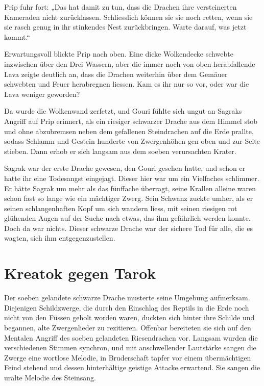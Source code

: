 Prip fuhr fort: „Das hat damit zu tun, dass die Drachen ihre versteinerten Kameraden nicht zurücklassen. Schliesslich können sie sie noch retten, wenn sie sie rasch genug in ihr stinkendes Nest zurückbringen. Warte darauf, was jetzt kommt.“

Erwartungsvoll blickte Prip nach oben. Eine dicke Wolkendecke schwebte inzwischen über den Drei Wassern, aber die immer noch von oben herabfallende Lava zeigte deutlich an, dass die Drachen weiterhin über dem Gemäuer schwebten und Feuer herabregnen liessen. Kam es ihr nur so vor, oder war die Lava weniger geworden?

Da wurde die Wolkenwand zerfetzt, und Gouri fühlte sich ungut an Sagraks Angriff auf Prip erinnert, als ein riesiger schwarzer Drache aus dem Himmel stob und ohne abzubremsen neben dem gefallenen Steindrachen auf die Erde prallte, sodass Schlamm und Gestein hunderte von Zwergenhöhen gen oben und zur Seite stieben. Dann erhob er sich langsam aus dem soeben verursachten Krater.

Sagrak war der erste Drache gewesen, den Gouri gesehen hatte, und schon er hatte ihr eine Todesangst eingejagt. Dieser hier war um ein Vielfaches schlimmer. Er hätte Sagrak um mehr als das fünffache überragt, seine Krallen alleine waren schon fast so lange wie ein mächtiger Zwerg. Sein Schwanz zuckte umher, als er seinen schlangenhaften Kopf um sich wandern liess, mit seinen riesigen rot glühenden Augen auf der Suche nach etwas, das ihm gefährlich werden konnte. Doch da war nichts. Dieser schwarze Drache war der sichere Tod für alle, die es wagten, sich ihm entgegenzustellen.


\newpage
\section{Kreatok gegen Tarok}

Der soeben gelandete schwarze Drache musterte seine Umgebung aufmerksam. Diejenigen Schildzwerge, die durch den Einschlag des Reptils in die Erde noch nicht von den Füssen geholt worden waren, duckten sich hinter ihre Schilde und begannen, alte Zwergenlieder zu rezitieren. Offenbar bereiteten sie sich auf den Mentalen Angriff des soeben gelandeten Riesendrachen vor. Langsam wurden die verschiedenen Stimmen synchron, und mit anschwellender Lautstärke sangen die Zwerge eine wortlose Melodie, in Bruderschaft tapfer vor einem übermächtigen Feind stehend und dessen hinterhältige geistige Attacke erwartend. Sie sangen die uralte Melodie des Steinsang.

